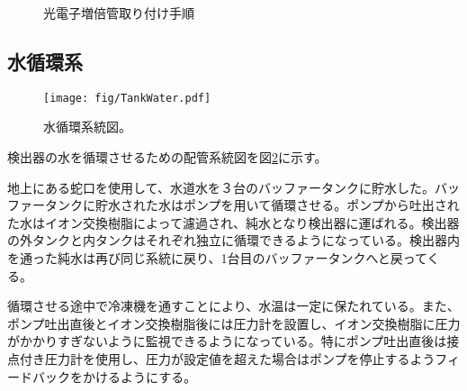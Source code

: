 \documentclass[11pt]{ltjsreport}
\newcommand{\figref}[1]{図\ref{#1}}
\begin{document}
\begin{figure}[htbp]
  \begin{minipage}{0.47\textwidth}
  \end{minipage}
  \hfill
  \begin{minipage}{0.47\textwidth}
  \end{minipage}
  \hfill
  \begin{minipage}{0.47\textwidth}
  \end{minipage}
  \hfill
  \begin{minipage}{0.47\textwidth}
  \end{minipage}
    \caption{光電子増倍管取り付け手順}
  \label{PMTAssyProcedure}
\end{figure}


\subsection{水循環系}

\begin{figure}[htbp]
\centering
\texttt{[image: fig/TankWater.pdf]}
\caption[水循環系統図]{水循環系統図。}
\label{WaterCirculation}
\end{figure}

検出器の水を循環させるための配管系統図を\figref{WaterCirculation}に示す。

地上にある蛇口を使用して、水道水を３台のバッファータンクに貯水した。バッファータンクに貯水された水はポンプを用いて循環させる。ポンプから吐出された水はイオン交換樹脂によって濾過され、純水となり検出器に運ばれる。検出器の外タンクと内タンクはそれぞれ独立に循環できるようになっている。検出器内を通った純水は再び同じ系統に戻り、1台目のバッファータンクへと戻ってくる。

循環させる途中で冷凍機を通すことにより、水温は一定に保たれている。また、ポンプ吐出直後とイオン交換樹脂後には圧力計を設置し、イオン交換樹脂に圧力がかかりすぎないように監視できるようになっている。特にポンプ吐出直後は接点付き圧力計を使用し、圧力が設定値を超えた場合はポンプを停止するようフィードバックをかけるようにする。
\end{document}
